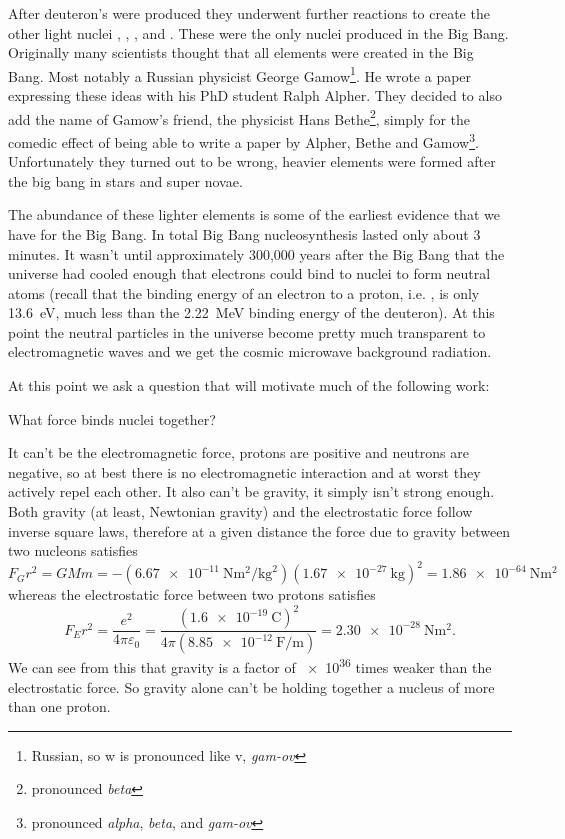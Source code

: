\documentclass[fleqn]{NotesClass}
\begin{document}
    After deuteron's were produced they underwent further reactions to create the other light nuclei , , , and .
    These were the only nuclei produced in the Big Bang.
    Originally many scientists thought that all elements were created in the Big Bang.
    Most notably a Russian physicist George Gamow\footnote{Russian, so w is pronounced like v, \textit{gam-ov}}.
    He wrote a paper expressing these ideas with his PhD student Ralph Alpher.
    They decided to also add the name of Gamow's friend, the physicist Hans Bethe\footnote{pronounced \textit{beta}}, simply for the comedic effect of being able to write a paper by Alpher, Bethe and Gamow\footnote{pronounced \textit{alpha}, \textit{beta}, and \textit{gam-ov}}.
    Unfortunately they turned out to be wrong, heavier elements were formed after the big bang in stars and super novae.
    
    The abundance of these lighter elements is some of the earliest evidence that we have for the Big Bang.
    In total Big Bang nucleosynthesis lasted only about 3 minutes.
    It wasn't until approximately 300,000 years after the Big Bang that the universe had cooled enough that electrons could bind to nuclei to form neutral atoms (recall that the binding energy of an electron to a proton, i.e. , is only \qty{13.6}{\electronvolt}, much less than the \qty{2.22}{\mega\electronvolt} binding energy of the deuteron).
    At this point the neutral particles in the universe become pretty much transparent to electromagnetic waves and we get the cosmic microwave background radiation.
    
    At this point we ask a question that will motivate much of the following work:
    \begin{important}
        What force binds nuclei together?
    \end{important}
    It can't be the electromagnetic force, protons are positive and neutrons are negative, so at best there is no electromagnetic interaction and at worst they actively repel each other.
    It also can't be gravity, it simply isn't strong enough.
    Both gravity (at least, Newtonian gravity) and the electrostatic force follow inverse square laws, therefore at a given distance the force due to gravity between two nucleons satisfies
    \begin{equation}
        F_Gr^2 = GMm = - (\qty{6.67e-11}{\newton\meter\squared\per\kilogram\squared})(\qty{1.67e-27}{\kilogram})^2 = \qty{1.86e-64}{\newton\meter\squared}
    \end{equation}
    whereas the electrostatic force between two protons satisfies
    \begin{equation}
        F_Er^2 = \frac{e^2}{4\pi\varepsilon_0} = \frac{(\qty{1.6e-19}{\coulomb})^2}{4\pi (\qty{8.85e-12}{\farad\per\meter})} = \qty{2.30e-28}{\newton\meter\squared}.
    \end{equation}
    We can see from this that gravity is a factor of \num{e36} times weaker than the electrostatic force.
    So gravity alone can't be holding together a nucleus of more than one proton.
    
\end{document}
